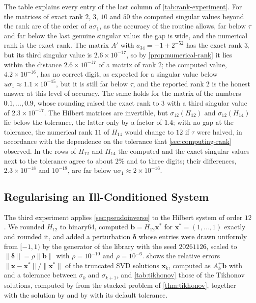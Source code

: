 The table explains every entry of the last column of \cref{tab:rank-experiment}. For the matrices of exact rank $2$, $3$, $10$ and $50$ the computed singular values beyond the rank are of the order of $u\sigma_1$, as the accuracy of the routine allows, far below $\tau$ and far below the last genuine singular value: the gap is wide, and the numerical rank is the exact rank. The matrix $A'$ with $a_{34}=-1+2^{-52}$ has the exact rank $3$, but its third singular value is $2.6\times10^{-17}$, so by \cref{prop:numerical-rank} it lies within the distance $2.6\times10^{-17}$ of a matrix of rank $2$; the computed value, $4.2\times10^{-16}$, has no correct digit, as expected for a singular value below $u\sigma_1\approx1.1\times10^{-15}$, but it is still far below $\tau$, and the reported rank $2$ is the honest answer at this level of accuracy. The same holds for the matrix of the numbers $0.1,\ldots,0.9$, whose rounding raised the exact rank to $3$ with a third singular value of $2.3\times10^{-17}$. The Hilbert matrices are invertible, but $\sigma_{12}(H_{12})$ and $\sigma_{12}(H_{14})$ lie below the tolerance, the latter only by a factor of $1.4$; with no gap at the tolerance, the numerical rank $11$ of $H_{14}$ would change to $12$ if $\tau$ were halved, in accordance with the dependence on the tolerance that \cref{sec:computing-rank} observed. In the rows of $H_{12}$ and $H_{14}$ the computed and the exact singular values next to the tolerance agree to about $2\%$ and to three digits; their differences, $2.3\times10^{-18}$ and $10^{-18}$, are far below $u\sigma_1\approx2\times10^{-16}$.

\subsection{Regularising an Ill-Conditioned System}

The third experiment applies \cref{sec:pseudoinverse} to the Hilbert system of order $12$. We rounded $H_{12}$ to binary64, computed $\mathbf b=H_{12}\mathbf x^*$ for $\mathbf x^*=(1,\ldots,1)$ exactly and rounded it, and added a perturbation $\boldsymbol\delta$ whose entries were drawn uniformly from $[-1,1)$ by the generator of the library with the seed $20261126$, scaled to $\|\boldsymbol\delta\|=\rho\|\mathbf b\|$ with $\rho=10^{-10}$ and $\rho=10^{-6}$.  shows the relative errors $\|\mathbf x-\mathbf x^*\|/\|\mathbf x^*\|$ of the truncated SVD solutions $\mathbf x_k$, computed as $A_k^+\mathbf b$ with  and a tolerance between $\sigma_k$ and $\sigma_{k+1}$, and \cref{tab:tikhonov} those of the Tikhonov solutions, computed by  from the stacked problem of \cref{thm:tikhonov}, together with the solution by  and by  with its default tolerance.

